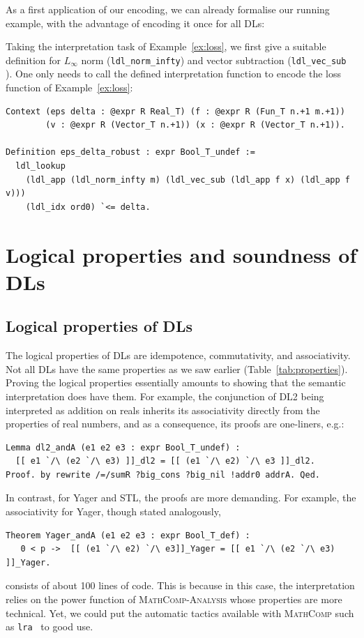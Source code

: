 \documentclass[a4paper,UKenglish,cleveref, autoref, thm-restate]{lipics-v2021}
\def\coqin#1{\texttt{#1}}
\def\DLtwo{\textrm{DL2}}
\def\STL{\textrm{STL}}
\def\Yager{\textrm{Yager}}
\def\mathcomp{\textsc{MathComp}}
\def\analysis{\textsc{MathComp-Analysis}}
\begin{document}
As a first application of our encoding, we can already formalise our
running example, with the advantage of encoding it once for all DLs:
\begin{example}\label{ex:ldlcoq}
Taking the interpretation task of Example~\ref{ex:loss}, 
we first give a suitable definition for $L_{\infty}$ norm (\coqin{ldl_norm_infty}) 
and vector subtraction (\coqin{ldl_vec_sub }).
One only needs to call the defined interpretation function 
to encode the loss function of Example~\ref{ex:loss}:

\begin{verbatim}
Context (eps delta : @expr R Real_T) (f : @expr R (Fun_T n.+1 m.+1)) 
        (v : @expr R (Vector_T n.+1)) (x : @expr R (Vector_T n.+1)).

Definition eps_delta_robust : expr Bool_T_undef :=
  ldl_lookup
    (ldl_app (ldl_norm_infty m) (ldl_vec_sub (ldl_app f x) (ldl_app f v)))
    (ldl_idx ord0) `<= delta.
\end{verbatim}
\end{example}

\section{Logical properties and soundness of DLs}
\label{sec:logical}

\subsection{Logical properties of DLs}

The logical properties of DLs are idempotence, commutativity, and
associativity.  Not all DLs have the same properties as we saw earlier
(Table~\ref{tab:properties}).  Proving the logical properties
essentially amounts to showing that the semantic interpretation does
have them. For example, the conjunction of \DLtwo{} being interpreted
as addition on reals inherits its associativity directly from the properties
of real numbers, and as a consequence, its proofs are one-liners, e.g.:
\begin{verbatim}
Lemma dl2_andA (e1 e2 e3 : expr Bool_T_undef) :
  [[ e1 `/\ (e2 `/\ e3) ]]_dl2 = [[ (e1 `/\ e2) `/\ e3 ]]_dl2.
Proof. by rewrite /=/sumR ?big_cons ?big_nil !addr0 addrA. Qed.
\end{verbatim} 

In contrast, for \Yager{} and \STL{}, the proofs are more demanding.  For
example, the associativity for \Yager, though stated analogously,
\begin{verbatim}
Theorem Yager_andA (e1 e2 e3 : expr Bool_T_def) :
   0 < p ->  [[ (e1 `/\ e2) `/\ e3]]_Yager = [[ e1 `/\ (e2 `/\ e3) ]]_Yager.
\end{verbatim} 
consists of about 100 lines of code. This is because in this case, the
interpretation relies on the power function of \analysis{} whose
properties are more technical. Yet, we could put the automatic tactics
available with \mathcomp{} such as \coqin{lra}~\cite{sakaguchi2022itp,algebratactics} to good use.
\end{document}
